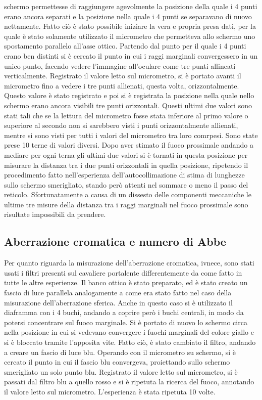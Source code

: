 schermo permettesse di raggiungere agevolmente la posizione della 
quale i 4 punti erano ancora separati e la posizione nella quale i 4 
punti se separavano di nuovo nettamente. Fatto ciò è stato possibile 
iniziare la vera e propria presa dati, per la quale è stato 
solamente utilizzato il micrometro che permetteva allo schermo uno 
spostamento parallelo all'asse ottico. Partendo dal punto per il 
quale i 4 punti erano ben distinti si è cercato il punto in cui i 
raggi marginali convergessero in un unico punto, facendo vedere 
l'immagine all'oculare come tre punti allineati verticalmente. 
Registrato il valore letto sul micrometro, si è portato avanti il 
micrometro fino a vedere i tre punti allienati, questa volta, 
orizzontalmente. Questo valore è stato registrato e poi si è 
registrata la posizione nella quale nello schermo erano ancora 
visibili tre punti orizzontali. Questi ultimi due valori sono stati 
tali che se la lettura del micrometro fosse stata inferiore al primo 
valore o superiore al secondo non si sarebbero visti i punti 
orizzontalmente allienati, mentre si sono visti per tutti i valori 
del micrometro tra loro comrpesi. Sono state prese 10 terne di 
valori diversi. Dopo aver stimato il fuoco prossimale andando a 
mediare per ogni terna gli ultimi due valori si è tornati in questa 
posizione per misurare la distanza tra i due punti orizzontali in 
quella posizione, ripetendo il procedimento fatto nell'esperienza 
dell'autocollimazione di stima di lunghezze sullo schermo 
smerigliato,  stando però attenti nel sommare o meno il passo del 
reticolo. Sfortunatamente a causa di un dissesto delle componenti 
meccaniche le ultime tre misure della distanza tra i raggi marginali 
nel fuoco prossimale sono risultate impossibili da prendere.

\subsection{Aberrazione cromatica e numero di Abbe}
Per quanto riguarda la misurazione dell'aberrazione cromatica, 
ivnece, sono stati usati i filtri presenti sul cavaliere portalente 
differentemente da come fatto in tutte le altre esperienze. Il banco 
ottico è stato preparato, ed è stato creato un fascio di luce 
parallela analogamente a come era stato fatto nel caso della 
misurazione dell'aberrazione sferica. Anche in questo caso si è 
utilizzato il diaframma con i 4 buchi, andando a coprire però i 
buchi centrali, in modo da potersi concentrare sul fuoco marginale. 
Si è portato di nuovo lo schermo circa nella posizione in cui si 
vedevano convergere i fuochi marginali del colore giallo e si è 
bloccato tramite l'apposita vite. Fatto ciò, è stato cambiato il 
filtro, andando a creare un fascio di luce blu. Operando con il 
micrometro su schermo, si è cercato il punto in cui il fascio blu 
convergeva, proiettando sullo schermo smerigliato un solo punto blu. 
Registrato il valore letto sul micrometro, si è passati dal filtro 
blu a quello rosso e si è ripetuta la ricerca del fuoco, annotando 
il valore letto sul micrometro. L'esperienza è stata ripetuta 10 
volte.
